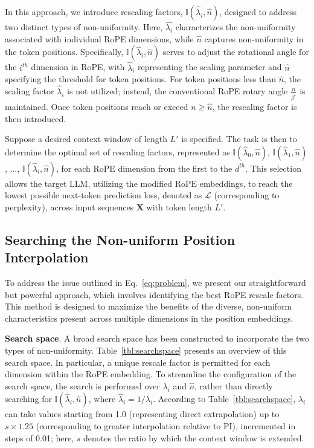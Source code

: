 In this approach, we introduce rescaling factors, $\mathbb{I}(\hat{\lambda}_{i},\hat{n})$, designed to address two distinct types of non-uniformity. Here, $\hat{\lambda_i}$ characterizes the non-uniformity associated with individual RoPE dimensions, while $\hat{n}$ captures non-uniformity in the token positions. Specifically, $\mathbb{I}(\hat{\lambda}_{i},\hat{n})$ serves to adjust the rotational angle for the $i^{th}$ dimension in RoPE, with $\hat{\lambda}_{i}$ representing the scaling parameter and $\hat{n}$ specifying the threshold for token positions. For token positions less than $\hat{n}$, the scaling factor $\hat{\lambda}_{i}$ is not utilized; instead, the conventional RoPE rotary angle $\frac{n}{\beta^i}$ is maintained. Once token positions reach or exceed $n\ge\hat{n}$, the rescaling factor is then introduced.

Suppose a desired context window of length $L'$ is specified. The task is then to determine the optimal set of rescaling factors, represented as $\mathbb{I}(\hat{\lambda}_{0},\hat{n})$, $\mathbb{I}(\hat{\lambda}_{1},\hat{n})$, ..., $\mathbb{I}(\hat{\lambda}_{i},\hat{n})$, for each RoPE dimension from the first to the $d^{th}$. This selection allows the target $\text{LLM}$, utilizing the modified $\text{RoPE}$ embeddings, to reach the lowest possible next-token prediction loss, denoted as $\mathcal{L}$ (corresponding to perplexity), across input sequences $\mathbf{X}$ with token length $L'$.

\subsection{Searching the Non-uniform Position Interpolation}

To address the issue outlined in Eq.~\ref{eq:problem}, we present our straightforward but powerful approach, which involves identifying the best RoPE rescale factors. This method is designed to maximize the benefits of the diverse, non-uniform characteristics present across multiple dimensions in the position embeddings.

\textbf{Search space}. A broad search space has been constructed to incorporate the two types of non-uniformity. Table~\ref{tbl:searchspace} presents an overview of this search space. In particular, a unique rescale factor is permitted for each dimension within the RoPE embedding. To streamline the configuration of the search space, the search is performed over $\lambda_i$ and $\hat{n}$, rather than directly searching for $\mathbb{I}(\hat{\lambda}_{i},\hat{n})$, where  $\hat{\lambda}_{i}=1/\lambda_i$. 
According to Table~\ref{tbl:searchspace}, $\lambda_i$ can take values starting from 1.0 (representing direct extrapolation) up to $s\times1.25$ (corresponding to greater interpolation relative to PI), incremented in steps of 0.01; here, $s$ denotes the ratio by which the context window is extended.

